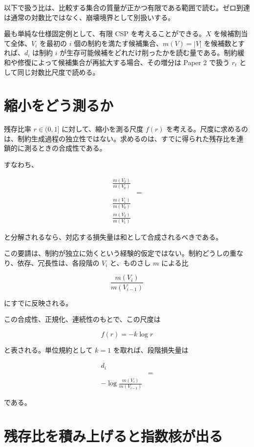 \documentclass[12pt,a4paper]{article}
\begin{document}
以下で扱う比は、比較する集合の質量が正かつ有限である範囲で読む。ゼロ到達は通常の対数比ではなく、崩壊境界として別扱いする。

最も単純な仕様固定例として、有限 CSP を考えることができる。\(X\) を候補割当て全体、\(V_{i}\) を最初の \(i\) 個の制約を満たす候補集合、\(m(V)=|V|\) を候補数とすれば、\(d_{i}\) は制約 \(i\) が生存可能候補をどれだけ削ったかを読む量である。制約緩和や修復によって候補集合が再拡大する場合、その増分は Paper 2 で扱う \(r_{t}\) として同じ対数比尺度で読める。

\section{縮小をどう測るか}\label{ux7e2eux5c0fux3092ux3069ux3046ux6e2cux308bux304b}

残存比率 \(r\in(0,1]\) に対して、縮小を測る尺度 \(f(r)\) を考える。尺度に求めるのは、制約生成過程の独立性ではない。求めるのは、すでに得られた残存比を連鎖的に測るときの合成性である。

すなわち、

\[
\begin{aligned}
\frac{m(V_2)}{m(V_0)} \\
&= \\
\frac{m(V_1)}{m(V_0)} \\
\frac{m(V_2)}{m(V_1)}
\end{aligned}
\]

と分解されるなら、対応する損失量は和として合成されるべきである。

この要請は、制約が独立に効くという経験的仮定ではない。制約どうしの重なり、依存、冗長性は、各段階の \(V_{i}\) と、ものさし \(m\) による比

\[
\frac{m(V_{i})}{m(V_{i-1})}
\]

にすでに反映される。

この合成性、正規化、連続性のもとで、この尺度は

\[
f(r)=-k\log r
\]

と表される。単位規約として \(k=1\) を取れば、段階損失量は

\[
\begin{aligned}
d_{i} \\
&= \\
-\log\frac{m(V_{i})}{m(V_{i-1})}
\end{aligned}
\]

である。

\section{残存比を積み上げると指数核が出る}\label{ux6b8bux5b58ux6bd4ux3092ux7a4dux307fux4e0aux3052ux308bux3068ux6307ux6570ux6838ux304cux51faux308b}
\end{document}
